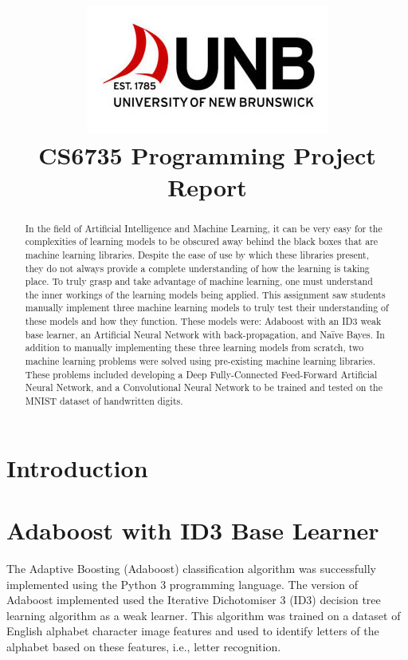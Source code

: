 \documentclass[a4paper]{article}
\title{\includegraphics[scale=0.75]{images/unblogo.jpg}\\CS6735 Programming Project Report}
\begin{document}
\maketitle

\begin{abstract}
    In the field of Artificial Intelligence and Machine Learning, it can be very easy for the complexities of learning models to be obscured away behind the black boxes that are machine learning libraries. Despite the ease of use by which these libraries present, they do not always provide a complete understanding of how the learning is taking place. To truly grasp and take advantage of machine learning, one must understand the inner workings of the learning models being applied. This assignment saw students manually implement three machine learning models to truly test their understanding of these models and how they function. These models were: Adaboost with an ID3 weak base learner, an Artificial Neural Network with back-propagation, and Naïve Bayes. In addition to manually implementing these three learning models from scratch, two machine learning problems were solved using pre-existing machine learning libraries. These problems included developing a Deep Fully-Connected Feed-Forward Artificial Neural Network, and a Convolutional Neural Network to be trained and tested on the MNIST dataset of handwritten digits.
\end{abstract}

\newpage

\section{Introduction}

\section{Adaboost with ID3 Base Learner}
The Adaptive Boosting (Adaboost) classification algorithm was successfully implemented using the Python 3 programming language. The version of Adaboost implemented used the Iterative Dichotomiser 3 (ID3) decision tree learning algorithm as a weak learner. This algorithm was trained on a dataset of English alphabet character image features and used to identify letters of the alphabet based on these features, i.e., letter recognition.
\end{document}

